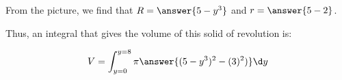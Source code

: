 \documentclass{ximera}
\begin{document}
\begin{exercise}
\begin{exercise}
\begin{image}
  \end{image}
                 
\begin{exercise}
From the picture, we find that $R = \answer{5-y^3}$ and $r= \answer{5-2 }$.

\begin{exercise}
Thus, an integral that gives the volume of this solid of revolution is:

\[
V = \int_{y=0}^{y=8} \pi \answer{(5-y^3)^2-(3)^2)} \d y
\]
\end{exercise}


\end{exercise}
\end{exercise}












\end{exercise}
\end{document}
